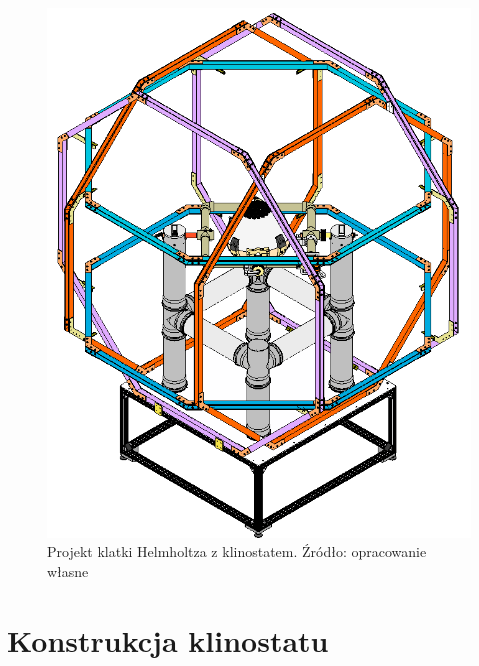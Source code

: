\begin{figure}
	\centering
	\includegraphics[scale=0.3]{klinostat_klatka}
	\caption{Projekt klatki Helmholtza z klinostatem. Źródło: opracowanie własne} 
	\label{fig:klatka_helmholtza}
\end{figure}

\section{Konstrukcja klinostatu} \label{konstrukcja}

